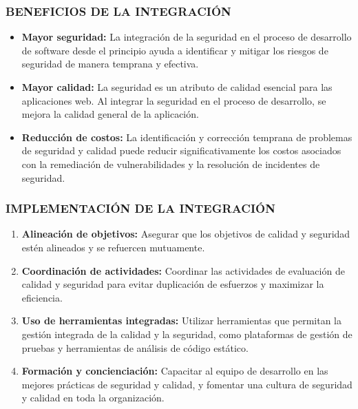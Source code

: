 \subsubsection{BENEFICIOS DE LA INTEGRACIÓN}

\begin{itemize}
    \item \textbf{Mayor seguridad:} La integración de la seguridad en el proceso de desarrollo de software desde el principio ayuda a identificar y mitigar los riesgos de seguridad de manera temprana y efectiva.
    \item \textbf{Mayor calidad:} La seguridad es un atributo de calidad esencial para las aplicaciones web. Al integrar la seguridad en el proceso de desarrollo, se mejora la calidad general de la aplicación.
    \item \textbf{Reducción de costos:} La identificación y corrección temprana de problemas de seguridad y calidad puede reducir significativamente los costos asociados con la remediación de vulnerabilidades y la resolución de incidentes de seguridad.
\end{itemize}

\subsubsection{IMPLEMENTACIÓN DE LA INTEGRACIÓN}

\begin{enumerate}
    \item \textbf{Alineación de objetivos:} Asegurar que los objetivos de calidad y seguridad estén alineados y se refuercen mutuamente.
    \item \textbf{Coordinación de actividades:} Coordinar las actividades de evaluación de calidad y seguridad para evitar duplicación de esfuerzos y maximizar la eficiencia.
    \item \textbf{Uso de herramientas integradas:} Utilizar herramientas que permitan la gestión integrada de la calidad y la seguridad, como plataformas de gestión de pruebas y herramientas de análisis de código estático.
    \item \textbf{Formación y concienciación:} Capacitar al equipo de desarrollo en las mejores prácticas de seguridad y calidad, y fomentar una cultura de seguridad y calidad en toda la organización.
\end{enumerate}
